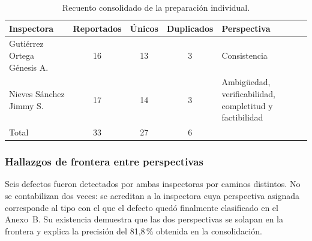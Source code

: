 \documentclass[journal,onecolumn]{IEEEtran}
\begin{document}
	\begin{table}[h!]
		\centering
		\caption{Recuento consolidado de la preparación individual.}
		\label{tab:recuento-preparacion}
		\begin{tabular}{
				>{\raggedright\arraybackslash}p{4.3cm}
				c c c
				>{\raggedright\arraybackslash}p{4cm}
			}
			\toprule
			\textbf{Inspectora} & \textbf{Reportados} & \textbf{Únicos} & \textbf{Duplicados} & \textbf{Perspectiva} \\
			\midrule
			Gutiérrez Ortega Génesis A. & 16 & 13 & 3 & Consistencia \\
			Nieves Sánchez Jimmy S. & 17 & 14 & 3 & Ambigüedad, verificabilidad,
			completitud y factibilidad \\
			\midrule
			Total & 33 & 27 & 6 & \\
			\bottomrule
		\end{tabular}
	\end{table}
	
	\subsubsection{Hallazgos de frontera entre perspectivas}
	
	Seis defectos fueron detectados por ambas inspectoras por caminos distintos.
	No se contabilizan dos veces: se acreditan a la inspectora cuya perspectiva
	asignada corresponde al tipo con el que el defecto quedó finalmente
	clasificado en el Anexo~B. Su existencia demuestra que las dos perspectivas
	se solapan en la frontera y explica la precisión del 81,8\,\% obtenida en la
	consolidación.
	
\end{document}
